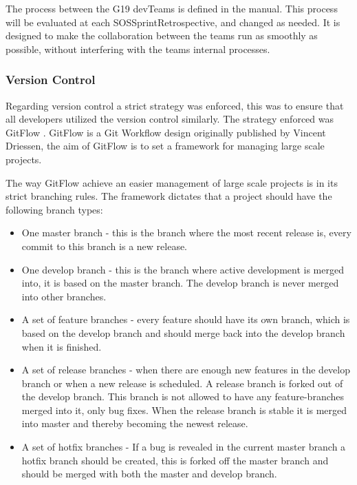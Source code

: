 The process between the \gls{G19} \glspl{devTeam} is defined in the manual. This process will be evaluated at each \gls{SOSSprintRetrospective}, and changed as needed. It is designed to make the collaboration between the \glspl{team} run as smoothly as possible, without interfering with the \glspl{team} internal processes.

\subsubsection{Version Control}
Regarding version control a strict strategy was enforced, this was to ensure that all developers utilized the version control similarly. The strategy enforced was GitFlow \cite{GitFlow}. GitFlow is a Git Workflow design originally published by Vincent Driessen, the aim of GitFlow is to set a framework for managing large scale projects.

The way GitFlow achieve an easier management of large scale projects is in its strict branching rules. The framework dictates that a project should have the following branch types\cite{GitFlow}:

\begin{itemize}
    \item One master branch - this is the branch where the most recent release is, every commit to this branch is a new release.
    \item One develop branch - this is the branch where active development is merged into, it is based on the master branch. The develop branch is never merged into other branches.
    \item A set of feature branches - every feature should have its own branch, which is based on the develop branch and should merge back into the develop branch when it is finished.
    \item A set of release branches - when there are enough new features in the develop branch or when a new release is scheduled. A release branch is forked out of the develop branch. This branch is not allowed to have any feature-branches merged into it, only bug fixes. When the release branch is stable it is merged into master and thereby becoming the newest release.
    \item A set of hotfix branches - If a bug is revealed in the current master branch a hotfix branch should be created, this is forked off the master branch and should be merged with both the master and develop branch.
\end{itemize}

